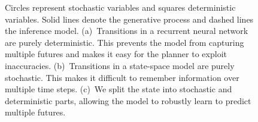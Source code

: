 \begin{figure}[t]
{Circles represent stochastic variables and squares deterministic variables. Solid lines denote the generative process and dashed lines the inference model.
(a)~Transitions in a recurrent neural network are purely deterministic. This prevents the model from capturing multiple futures and makes it easy for the planner to exploit inaccuracies.
(b)~Transitions in a state-space model are purely stochastic. This makes it difficult to remember information over multiple time steps.
(c)~We split the state into stochastic and deterministic parts, allowing the model to robustly learn to predict multiple futures.}
\label{fig:models}
\end{figure}

